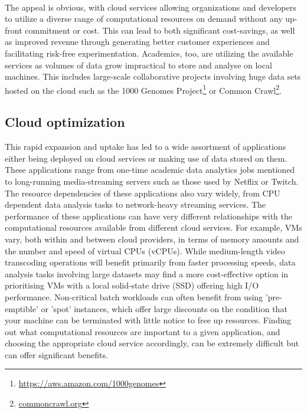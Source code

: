 \documentclass{report}
\begin{document}
\paragraph{}
The appeal is obvious, with cloud services allowing organizations and developers to utilize a diverse range of computational resources on demand without any up-front commitment or cost\cite{Armbrust2009}. This can lead to both significant cost-savings, as well as improved revenue through generating better customer experiences and facilitating risk-free experimentation\cite{Power2018}. Academics, too, are utilizing the available services as volumes of data grow impractical to store and analyse on local machines\cite{Berriman2013, Ruiz-Alvarez2011}. This includes large-scale collaborative projects involving huge data sets hosted on the cloud such as the 1000 Genomes Project\footnote{\url{https://aws.amazon.com/1000genomes}} or Common Crawl\footnote{\url{commoncrawl.org}}.

\subsection{Cloud optimization}
This rapid expansion and uptake has led to a wide assortment of applications either being deployed on cloud services or making use of data stored on them. These applications range from one-time academic data analytics jobs mentioned to long-running media-streaming servers such as those used by Netflix or Twitch\cite{Bilal2017}. The resource dependencies of these applications also vary widely, from CPU dependent data analysis tasks to network-heavy streaming services. The performance of these applications can have very different relationships with the computational resources available from different cloud services. For example, VMs vary, both within and between cloud providers, in terms of memory amounts and the number and speed of virtual CPUs (vCPUs). While medium-length video transcoding operations will benefit primarily from faster processing speeds, data analysis tasks involving large datasets may find a more cost-effective option in prioritising VMs with a local solid-state drive (SSD) offering high I/O performance. Non-critical batch workloads can often benefit from using 'pre-emptible' or 'spot' instances, which offer large discounts on the condition that your machine can be terminated with little notice to free up resources. Finding out what computational resources are important to a given application, and choosing the appropriate cloud service accordingly, can be extremely difficult but can offer significant benefits.
\end{document}
